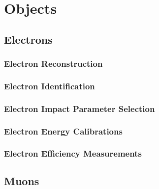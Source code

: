 

\section{Objects}
\subsection{Electrons}
\subsubsection{Electron Reconstruction}
\label{sec:eleReco}

\subsubsection{Electron Identification}
\label{sec:eleID}

\subsubsection{Electron Impact Parameter Selection}
\label{sec:eleSIP}

%
\subsubsection{Electron Energy Calibrations}

\subsubsection{Electron Efficiency Measurements}
\label{sec:eleEffMeas}

\subsection{Muons}
